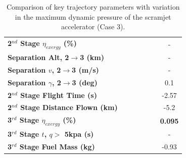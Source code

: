 \begin{table}[ht!]
\begin{tabular}{l c c c c c c}
	\hline 
	\textbf{2$^{nd}$ Stage $\eta_{exergy}$ (\%)}
	& \textbf{\secondExergyEffqFortyFiveNoReturn}
	& \textbf{\secondExergyEffqFortySevenNoReturn}
	& \textbf{\secondExergyEffqStandardNoReturn}
	& \textbf{\secondExergyEffqFiftyTwoNoReturn}
	& \textbf{\secondExergyEffqFiftyFiveNoReturn}
	& -
	\\
	\textbf{Separation Alt, 2$\rightarrow$3 (km)}
	& \secondthirdSeparationAltqFortyFiveNoReturn
	& \secondthirdSeparationAltqFortySevenNoReturn
	& \secondthirdSeparationAltqStandardNoReturn
	& \secondthirdSeparationAltqFiftyTwoNoReturn
	& \secondthirdSeparationAltqFiftyFiveNoReturn
	& -
	\\
	\textbf{Separation $v$, 2$\rightarrow$3 (m/s)}
	& \secondthirdSeparationvqFortyFiveNoReturn
	& \secondthirdSeparationvqFortySevenNoReturn
	& \secondthirdSeparationvqStandardNoReturn
	& \secondthirdSeparationvqFiftyTwoNoReturn
	& \secondthirdSeparationvqFiftyFiveNoReturn
	& -
	\\
	\textbf{Separation $\gamma$, 2$\rightarrow$3 (deg)}
	& \secondthirdSeparationgammaqFortyFiveNoReturn
	& \secondthirdSeparationgammaqFortySevenNoReturn
	& \secondthirdSeparationgammaqStandardNoReturn
	& \secondthirdSeparationgammaqFiftyTwoNoReturn
	& \secondthirdSeparationgammaqFiftyFiveNoReturn
	&0.1
	\\
	\textbf{2$^{nd}$ Stage Flight Time (s)}
	& \secondFlightTimeqFortyFiveNoReturn
	& \secondFlightTimeqFortySevenNoReturn
	& \secondFlightTimeqStandardNoReturn
	& \secondFlightTimeqFiftyTwoNoReturn
	& \secondFlightTimeqFiftyFiveNoReturn
	&-2.57
	\\
	\textbf{2$^{nd}$ Stage Distance Flown (km)}
	& \SecondDistqFortyFiveNoReturn
	& \SecondDistqFortySevenNoReturn
	& \SecondDistqStandardNoReturn
	& \SecondDistqFiftyTwoNoReturn
	& \SecondDistqFiftyFiveNoReturn
	&-5.2
	\\
	\hline 
	\textbf{3$^{rd}$ Stage $\eta_{exergy}$ (\%)}
	& \textbf{\thirddExergyEffqFortyFiveNoReturn}
	& \textbf{\thirddExergyEffqFortySevenNoReturn}
	& \textbf{\thirddExergyEffqStandardNoReturn}
	& \textbf{\thirddExergyEffqFiftyTwoNoReturn}
	& \textbf{\thirddExergyEffqFiftyFiveNoReturn}
	& \textbf{0.095}
	\\
	\textbf{3$^{rd}$ Stage $t$, $q >$ 5kpa (s)}
	& \thirdqOverFiveqFortyFiveNoReturn
	& \thirdqOverFiveqFortySevenNoReturn
	& \thirdqOverFiveqStandardNoReturn
	& \thirdqOverFiveqFiftyTwoNoReturn
	& \thirdqOverFiveqFiftyFiveNoReturn
	& -
	\\
	\textbf{3$^{rd}$ Stage Fuel Mass (kg)}
	& \thirdmFuelqFortyFiveNoReturn
	& \thirdmFuelqFortySevenNoReturn
	& \thirdmFuelqStandardNoReturn
	& \thirdmFuelqFiftyTwoNoReturn
	& \thirdmFuelqFiftyFiveNoReturn
	&-0.93
	\\
	\hline 
\end{tabular} 
	\caption{Comparison of key trajectory parameters with variation in the maximum dynamic pressure of the scramjet accelerator (Case 3).}
	\label{tab:qvarnoreturn}
\end{table}

